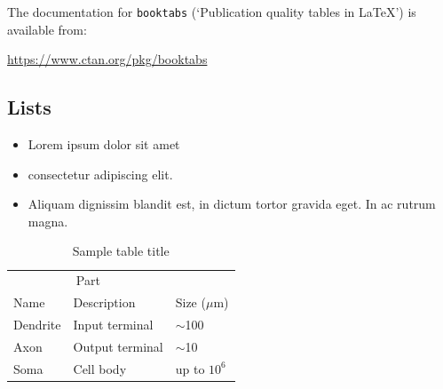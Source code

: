 \documentclass{article}
\begin{document}
The documentation for \verb+booktabs+ (`Publication quality tables in LaTeX') is available from:
\begin{center}
	\url{https://www.ctan.org/pkg/booktabs}
\end{center}




\subsection{Lists}
\begin{itemize}
	\item Lorem ipsum dolor sit amet
	\item consectetur adipiscing elit.
	\item Aliquam dignissim blandit est, in dictum tortor gravida eget. In ac rutrum magna.
\end{itemize}

\begin{table}
	\caption{Sample table title}
	\centering
	\begin{tabular}{lll}
		\toprule
		\multicolumn{2}{c}{Part}                   \\
		\cmidrule(r){1-2}
		Name     & Description     & Size ($\mu$m) \\
		\midrule
		Dendrite & Input terminal  & $\sim$100     \\
		Axon     & Output terminal & $\sim$10      \\
		Soma     & Cell body       & up to $10^6$  \\
		\bottomrule
	\end{tabular}
	\label{tab:table}
\end{table}



\end{document}
